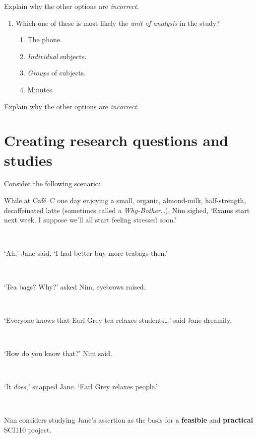 \documentclass[
  11pt,
  a4paper,
  krantz2]{krantz}
\makeatletter
\providecommand{\tightlist}{%
  \setlength{\itemsep}{0pt}\setlength{\parskip}{0pt}}
\newlength{\greyboxheight}
\newcommand{\setgreyboxheight}[1]{%
  \setlength{\greyboxheight}{2.3\baselineskip * #1}%
}
\newenvironment{greybox}[1]{%
  \nopagebreak
  \setgreyboxheight{#1}%
  \begin{tcolorbox}[
    colframe=gray!30!black,
    boxrule=2pt,
    width=\linewidth,
    height=\greyboxheight,
    valign=center,
    colback=white,
    left=4pt,
    right=4pt, 
    top=4pt, 
    bottom=4pt,
    before skip=4pt,
    after skip=4pt
  ]
\vspace*{\greyboxheight} %
}{%
  \end{tcolorbox}
  \goodbreak
}
\newcommand{\greyboxlines}[1]{\noindent\begin{greybox}{#1}\end{greybox}}
\renewenvironment{quote}%
{\begin{kframe}}
{\end{kframe}}
\newenvironment{kframe}{%
\medskip{}
\setlength{\fboxsep}{.8em}
 \def\at@end@of@kframe{}%
 \ifinner\ifhmode%
  \def\at@end@of@kframe{\end{minipage}}%
  \begin{minipage}{\columnwidth}%
 \fi\fi%
 \def\FrameCommand##1{\hskip\@totalleftmargin \hskip-\fboxsep
 \colorbox{shadecolor}{##1}\hskip-\fboxsep
     \hskip-\linewidth \hskip-\@totalleftmargin \hskip\columnwidth}%
 \MakeFramed {\advance\hsize-\width
   \@totalleftmargin\z@ \linewidth\hsize
   \@setminipage}}%
 {\par\unskip\endMakeFramed%
 \at@end@of@kframe}
\renewenvironment{quote}
               {\list{}{\vspace{-0.5em}\begin{kframe}\small%
                        \rightmargin   \leftmargin
                        \parsep        \z@ \@plus\p@}%
                \item\relax}
               {\end{kframe}\endlist}
\makeatother
\begin{document}
Explain why the other options are \emph{incorrect}.
\greyboxlines{2}

\begin{enumerate}
\def\labelenumi{\arabic{enumi}.}
\setcounter{enumi}{7}
\tightlist
\item
  Which one of these is most likely the \emph{unit of analysis} in the study?

  \begin{enumerate}
  \def\labelenumii{\alph{enumii}.}
  \tightlist
  \item
    The phone.
  \item
    \emph{Individual} subjects.
  \item
    \emph{Groups} of subjects.
  \item
    Minutes.
  \end{enumerate}
\end{enumerate}

Explain why the other options are \emph{incorrect}.
\greyboxlines{2}

\section{Creating research questions and studies}\label{CreateRQs}

Consider the following scenario:

\begin{quote}
While at Café~C one day enjoying a small, organic, almond-milk, half-strength, decaffeinated latte (sometimes called a \emph{Why-Bother}\ldots), Nim sighed, `Exams start next week.
I suppose we'll all start feeling stressed soon.'\\
\strut ~

`Ah,' Jane said, `I had better buy more teabags then.'\\
\strut ~

`Tea bags? Why?' asked Nim, eyebrows raised.\\
\strut ~

`Everyone knows that Earl Grey tea relaxes students\ldots{}' said Jane dreamily.\\
\strut ~

`How do you know that?' Nim said.\\
\strut ~

`It \emph{does},' snapped Jane.
`Earl Grey relaxes people.'

~
\end{quote}

Nim considers studying Jane's assertion as the basis for a \textbf{feasible} and \textbf{practical} SCI110 project.
\end{document}
